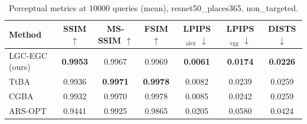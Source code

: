 \begin{table}[t]
\centering\footnotesize
\caption{Perceptual metrics at 10000 queries (mean), resnet50\_places365, non\_targeted.}
\begin{tabular}{lcccccc}
\toprule
Method & SSIM $\uparrow$ & MS-SSIM $\uparrow$ & FSIM $\uparrow$ & LPIPS$_{\mathrm{alex}}$ $\downarrow$ & LPIPS$_{\mathrm{vgg}}$ $\downarrow$ & DISTS $\downarrow$ \\
\midrule
LGC-EGC (ours) & \textbf{0.9953} & 0.9967 & 0.9969 & \textbf{0.0061} & \textbf{0.0174} & \textbf{0.0226} \\
TtBA & 0.9936 & \textbf{0.9971} & \textbf{0.9978} & 0.0082 & 0.0239 & 0.0259 \\
CGBA & 0.9932 & 0.9970 & 0.9978 & 0.0085 & 0.0242 & 0.0259 \\
ARS-OPT & 0.9441 & 0.9925 & 0.9865 & 0.0205 & 0.0580 & 0.0424 \\
\bottomrule
\end{tabular}
\end{table}
